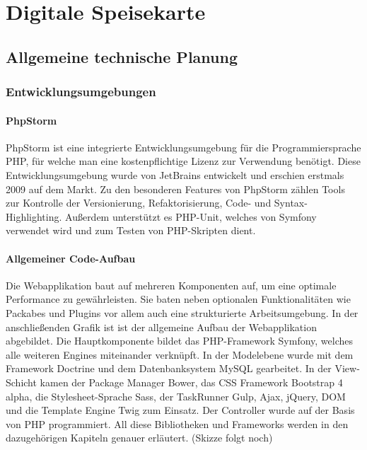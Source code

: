 \chapter{Digitale Speisekarte}
\renewcommand{\kapitelautor}{Autor: Katharina Joksch}

\section{Allgemeine technische Planung}

  \subsection{Entwicklungsumgebungen}

    \subsubsection{PhpStorm}

PhpStorm ist eine integrierte Entwicklungsumgebung für die Programmiersprache PHP, für welche man eine kostenpflichtige Lizenz zur Verwendung benötigt. Diese Entwicklungsumgebung wurde von JetBrains entwickelt und erschien erstmals 2009 auf dem Markt. Zu den besonderen Features von PhpStorm zählen Tools zur Kontrolle der Versionierung, Refaktorisierung, Code- und Syntax-Highlighting. Außerdem unterstützt es PHP-Unit, welches von Symfony verwendet wird und zum Testen von PHP-Skripten dient. 

    \subsubsection{Allgemeiner Code-Aufbau}
    
Die Webapplikation baut auf mehreren Komponenten auf, um eine optimale Performance zu gewährleisten. Sie baten neben optionalen Funktionalitäten wie Packabes und Plugins vor allem auch eine strukturierte Arbeitsumgebung.
In der anschließenden Grafik ist ist der allgemeine Aufbau der Webapplikation abgebildet. Die Hauptkomponente bildet das PHP-Framework Symfony, welches alle weiteren Engines miteinander verknüpft. In der Modelebene wurde mit dem Framework Doctrine und dem Datenbanksystem MySQL gearbeitet. In der View-Schicht kamen der Package Manager Bower, das CSS Framework Bootstrap 4 alpha, die Stylesheet-Sprache Sass, der TaskRunner Gulp, Ajax, jQuery, DOM und die Template Engine Twig zum Einsatz. Der Controller wurde auf der Basis von PHP programmiert. All diese Bibliotheken und Frameworks werden in den dazugehörigen Kapiteln genauer erläutert.
(Skizze folgt noch)

